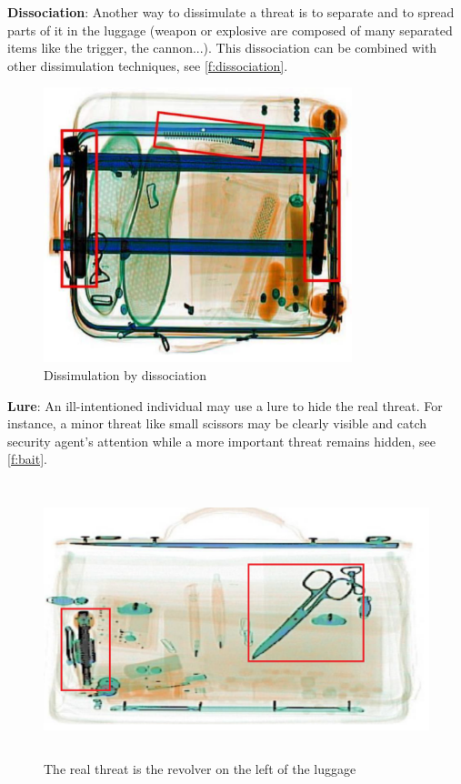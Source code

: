 \textbf{Dissociation}: Another way to dissimulate a threat is to separate and to spread parts of it in the luggage (weapon or explosive are composed of many separated items like the trigger, the cannon...). This dissociation can be combined with other dissimulation techniques,  see  \autoref{f:dissociation}.
\begin{figure}
\centering
	\includegraphics[width=0.8\textwidth]{Figures/Dissociation}
	\caption{Dissimulation by dissociation}
	\label{f:dissociation}
\end{figure}

\textbf{Lure}: An ill-intentioned individual may use a lure to hide the real threat. For instance, a minor threat like small scissors may be clearly visible and catch security agent's attention while a more important threat remains hidden, see  \autoref{f:bait}.
\begin{figure}
\centering
	\includegraphics[height=8cm]{Figures/bait}
	\caption[Dissimulation using a bait.]{The real threat is the revolver on the left of the luggage}
	\label{f:bait}
\end{figure}

